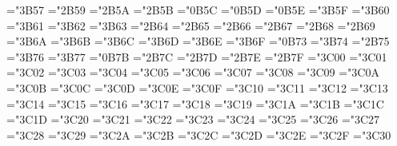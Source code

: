 \mathchardef\Lleftarrow="3B57
\mathchardef\veebar="2B59
\mathchardef\barwedge="2B5A
\mathchardef\doublebarwedge="2B5B
\mathchardef\angle="0B5C
\mathchardef\measuredangle="0B5D
\mathchardef\sphericalangle="0B5E
\mathchardef\varpropto="3B5F
\mathchardef\smallsmile="3B60
\mathchardef\smallfrown="3B61
\mathchardef\Subset="3B62
\mathchardef\Supset="3B63
\mathchardef\Cup="2B64
\let\doublecup=\Cup
\mathchardef\Cap="2B65
\let\doublecap=\Cap
\mathchardef\curlywedge="2B66
\mathchardef\curlyvee="2B67
\mathchardef\leftthreetimes="2B68
\mathchardef\rightthreetimes="2B69
\mathchardef\subseteqq="3B6A
\mathchardef\supseteqq="3B6B
\mathchardef\bumpeq="3B6C
\mathchardef\Bumpeq="3B6D
\mathchardef\lll="3B6E
\let\llless=\lll
\mathchardef\ggg="3B6F
\let\gggtr=\ggg
\mathchardef\circledS="0B73
\mathchardef\pitchfork="3B74
\mathchardef\dotplus="2B75
\mathchardef\backsim="3B76
\mathchardef\backsimeq="3B77
\mathchardef\complement="0B7B
\mathchardef\intercal="2B7C
\mathchardef\circledcirc="2B7D
\mathchardef\circledast="2B7E
\mathchardef\circleddash="2B7F
\def\ulcorner{\delimiter"4B70B70 }
\def\urcorner{\delimiter"5B71B71 }
\def\llcorner{\delimiter"4B78B78 }
\def\lrcorner{\delimiter"5B79B79 }
\def\yen{\mathhexbox B55 }
\def\checkmark{\mathhexbox B58 }
\def\circledR{\mathhexbox B72 }
\def\maltese{\mathhexbox B7A }
\mathchardef\lvertneqq="3C00
\mathchardef\gvertneqq="3C01
\mathchardef\nleq="3C02
\mathchardef\ngeq="3C03
\mathchardef\nless="3C04
\mathchardef\ngtr="3C05
\mathchardef\nprec="3C06
\mathchardef\nsucc="3C07
\mathchardef\lneqq="3C08
\mathchardef\gneqq="3C09
\mathchardef\nleqslant="3C0A
\mathchardef\ngeqslant="3C0B
\mathchardef\lneq="3C0C
\mathchardef\gneq="3C0D
\mathchardef\npreceq="3C0E
\mathchardef\nsucceq="3C0F
\mathchardef\precnsim="3C10
\mathchardef\succnsim="3C11
\mathchardef\lnsim="3C12
\mathchardef\gnsim="3C13
\mathchardef\nleqq="3C14
\mathchardef\ngeqq="3C15
\mathchardef\precneqq="3C16
\mathchardef\succneqq="3C17
\mathchardef\precnapprox="3C18
\mathchardef\succnapprox="3C19
\mathchardef\lnapprox="3C1A
\mathchardef\gnapprox="3C1B
\mathchardef\nsim="3C1C
\mathchardef\napprox="3C1D
\mathchardef\varsubsetneq="3C20
\mathchardef\varsupsetneq="3C21
\mathchardef\nsubseteqq="3C22
\mathchardef\nsupseteqq="3C23
\mathchardef\subsetneqq="3C24
\mathchardef\supsetneqq="3C25
\mathchardef\varsubsetneqq="3C26
\mathchardef\varsupsetneqq="3C27
\mathchardef\subsetneq="3C28
\mathchardef\supsetneq="3C29
\mathchardef\nsubseteq="3C2A
\mathchardef\nsupseteq="3C2B
\mathchardef\nparallel="3C2C
\mathchardef\nmid="3C2D
\mathchardef\nshortmid="3C2E
\mathchardef\nshortparallel="3C2F
\mathchardef\nvdash="3C30
